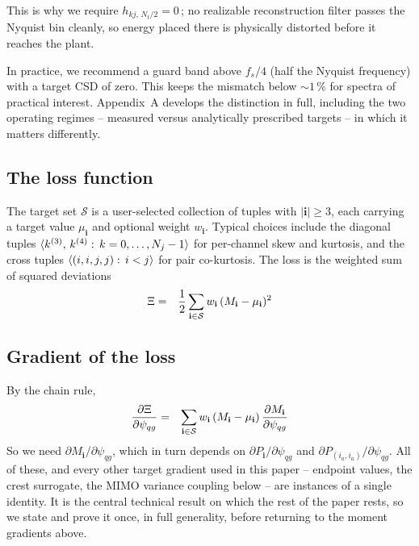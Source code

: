 \documentclass[10pt,a4paper]{article}
\numberwithin{equation}{section}
\DeclarePairedDelimiter\seq{\langle}{\rangle}
\DeclarePairedDelimiter\mat{(}{)}
\begin{document}
This is why we require $h_{k j,\, N_t/2}=0\,$; no realizable reconstruction filter passes the Nyquist bin cleanly, so energy placed there is physically distorted before it reaches the plant. 

In practice, we recommend a guard band above $f_s/4$ (half the Nyquist frequency) with a target CSD of zero. This keeps the mismatch below ${\sim}1\,\%$ for spectra of practical interest. Appendix~A develops the distinction in full, including the two operating regimes -- measured versus analytically prescribed targets -- in which it matters differently.

\subsection*{The loss function}
The target set $\mathcal{S}$ is a user-selected collection of tuples with $|\mathbf{i}|\geq 3$, each carrying a target value $\mu_\mathbf{i}$ and optional weight $w_\mathbf{i}$. Typical choices include the diagonal tuples $\seq{k^{(3)},\,k^{(4)}:\,k=0,\ldots,N_j-1}$ for per-channel skew and kurtosis, and the cross tuples $\seq{(i,i,j,j):\,i<j}$ for pair co-kurtosis. The loss is the weighted sum of squared deviations
\begin{eqnarray}
\Xi &=& \frac{1}{2}\sum_{\mathbf{i}\in\mathcal{S}} w_\mathbf{i}\,\mat{M_\mathbf{i} - \mu_\mathbf{i}}^2
\end{eqnarray}

\subsection*{Gradient of the loss}
By the chain rule,
\begin{eqnarray}
\frac{\partial \Xi}{\partial \psi_{q g}} &=& \sum_{\mathbf{i}\in\mathcal{S}} w_\mathbf{i}\,\mat{M_\mathbf{i} - \mu_\mathbf{i}}\,\frac{\partial M_\mathbf{i}}{\partial \psi_{q g}}
\end{eqnarray}
So we need $\partial M_\mathbf{i}/\partial \psi_{q g}$, which in turn depends on $\partial P_\mathbf{i}/\partial \psi_{q g}$ and $\partial P_{(i_a,i_a)}/\partial \psi_{q g}$. All of these, and every other target gradient used in this paper -- endpoint values, the crest surrogate, the MIMO variance coupling below -- are instances of a single identity. It is the central technical result on which the rest of the paper rests, so we state and prove it once, in full generality, before returning to the moment gradients above.
\end{document}
